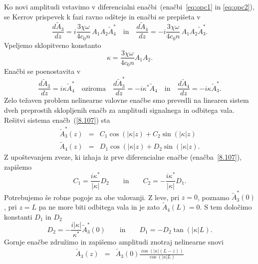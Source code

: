 Ko novi amplitudi vstavimo v diferencialni enačbi~(enačbi~\ref{eq:opc1} in 
\ref{eq:opc2}), se Kerrov prispevek k fazi ravno odšteje
in enačbi se prepišeta v 
\begin{equation}
\frac{d\tilde{A}_{3}}{dz}=i\frac{ 3 \chi \omega}{4 c_0 n}\,
A_{1}A_{2}\tilde{A}_{4}^{*} \quad \textrm{in} \quad 
\frac{d\tilde{A}_{4}}{dz}=-i\frac{ 3 \chi \omega}{4 c_0 n}\,
A_{1}A_{2}\tilde{A}_{3}^*.
\label{8.105}
\end{equation}
Vpeljemo sklopitveno konstanto
\begin{equation}
\kappa=\frac{ 3 \chi \omega}{4 c_0 n}A_1 A_2.
\label{8.106}
\end{equation}
Enačbi se poenostavita v 
\begin{equation}
\frac{d\tilde{A}_{3}}{dz}=i\kappa \tilde{A}_{4}^{*} \quad
\textrm{oziroma} \quad \frac{d\tilde{A}^*_{3}}{dz}=-i\kappa^* \tilde{A}_{4} 
\quad \textrm{in} \quad
\frac{d\tilde{A}_{4}}{dz}=-i\kappa \tilde{A}_{3}^*.
\label{8.107}
\end{equation}
Zelo težaven problem nelinearne valovne enačbe smo prevedli na linearen
sistem dveh preprostih sklopljenih enačb za amplitudi signalnega in
odbitega vala. Rešitvi sistema enačb~(\ref{8.107}) 
sta 
\begin{eqnarray}
\tilde{A}_3^* \left(z\right) & = & C_{1}\cos(\left|\kappa\right|z)+
C_{2}\sin(\left|\kappa\right|z)
\label{8.108}\\
\tilde{A}_4 \left(z\right) & = & D_{1}\cos(\left|\kappa\right|z)+
D_{2}\sin(\left|\kappa\right|z).
\label{8.108a}
\end{eqnarray}
Z upoštevanjem zveze, ki izhaja  iz prve diferencialne enačbe 
(enačba~\ref{8.107}), zapišemo
\begin{equation}
C_1 = \frac{i \kappa^*}{|\kappa|}D_2 \qquad
\textrm{in} \qquad 
C_2 = -\frac{i \kappa^*}{|\kappa|}D_1. 
\end{equation}
Potrebujemo še robne pogoje za obe valovanji. Z leve, pri $z=0$,
poznamo $\tilde{A}_{3}^{*}\left(0\right)$, pri $z=L$ pa ne more biti odbitega
vala in je zato $\tilde{A}_{4}\left(L\right)=0$. S tem določimo konstanti $D_{1}$
in $D_{2}$
\begin{equation}
D_2 = -\frac{i|\kappa|}{\kappa^*} \tilde{A}_3^*(0) \qquad
\textrm{in} \qquad 
D_1 = -D_2 \tan(|\kappa|L). 
\end{equation}
Gornje enačbe združimo in zapišemo amplitudi znotraj nelinearne snovi
\begin{eqnarray}
\tilde{A}_{3}\left(z\right) & = & \tilde{A}_3(0)
\frac{\cos\left(|\kappa|(L-z)\right)}{\cos\left(|\kappa|L\right)}
\end{eqnarray}
